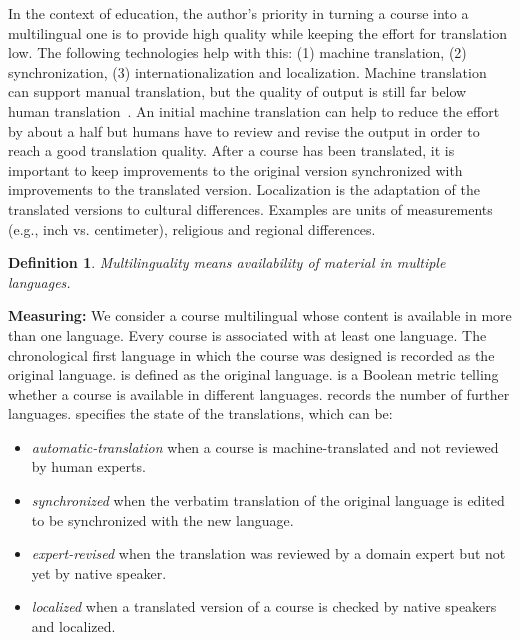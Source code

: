 \documentclass{sig-alternate}
\theoremstyle{definition}
\newtheorem{defn}{Definition}
\begin{document}
In the context of education, the author's priority in turning a course into a multilingual one is to provide high quality while keeping the effort for translation low.
The following technologies help with this: (1) machine translation, (2) synchronization,
(3) internationalization and localization.
Machine translation can support manual translation, but the quality of output is still far below human translation~\parencite{Green.2013}.
An initial machine translation can help to reduce the effort by about a half but humans have to review and revise the output in order to reach a good translation quality.
After a course has been translated, it is important to keep improvements to the original version synchronized with improvements to the translated version.
Localization is the adaptation of the translated versions to cultural differences.
Examples are units of measurements (e.g., inch vs. centimeter), religious and regional differences.

\begin{defn}
\emph {Multilinguality means availability of material in multiple languages.}
\end{defn}

\noindent\textbf{Measuring:}
We consider a course multilingual whose content is available in more than one language.
Every course is associated with at least one language.
The chronological first language in which the course was designed is recorded as the original language.
 is defined as the original language.
 is a Boolean metric telling whether a course is available in different languages.
 records the number of further languages.
 specifies the state of the translations, which can be:
\begin{itemize}
\item \emph{automatic-translation} when a course is machine-translated and not reviewed by human experts.
\item \emph{synchronized} when the verbatim translation of the original language is edited to be synchronized with the new language.
\item \emph{expert-revised} when the translation was reviewed by a domain expert but not yet by native speaker.
\item \emph{localized} when a translated version of a course is checked by native speakers and localized.
\end{itemize}
\end{document}
